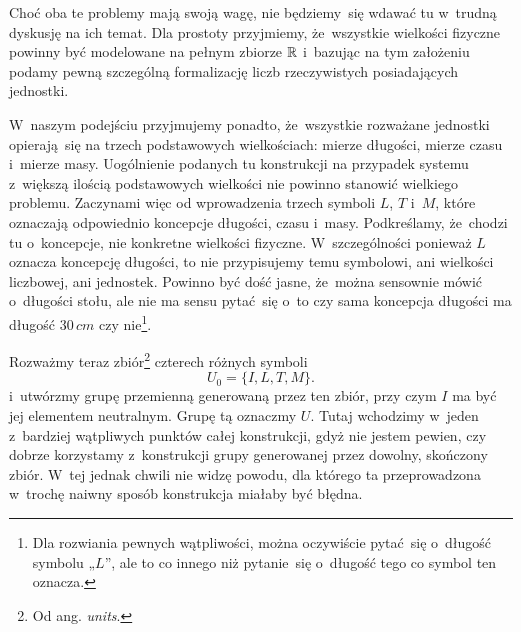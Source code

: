 \documentclass[a4paper,11pt]{article}
\numberwithin{equation}{section}
\begin{document}
Choć oba te problemy mają swoją wagę, nie będziemy~się wdawać tu w~trudną
dyskusję na ich temat. Dla prostoty przyjmiemy, że~wszystkie wielkości
fizyczne powinny być modelowane na pełnym zbiorze $\mathbb{R}$ i~bazując
na tym założeniu podamy pewną szczególną formalizację liczb rzeczywistych
posiadających jednostki.

W~naszym podejściu przyjmujemy ponadto, że~wszystkie rozważane jednostki
opierają~się na trzech podstawowych wielkościach: mierze długości,
mierze czasu i~mierze masy. Uogólnienie podanych tu konstrukcji na
przypadek systemu z~większą ilością podstawowych wielkości nie powinno
stanowić wielkiego problemu.
Zaczynami więc od wprowadzenia trzech symboli $L$, $T$ i~$M$, które
oznaczają odpowiednio koncepcje długości, czasu i~masy. Podkreślamy,
że~chodzi tu o~koncepcje, nie konkretne wielkości fizyczne. W~szczególności
ponieważ $L$ oznacza koncepcję długości, to nie przypisujemy temu symbolowi,
ani wielkości liczbowej, ani jednostek. Powinno być dość jasne, że~można
sensownie mówić o~długości stołu, ale nie ma sensu pytać~się o~to czy
sama koncepcja długości ma długość $30 \, \si{cm}$ czy nie\footnote{Dla
  rozwiania pewnych wątpliwości, można oczywiście pytać~się o~długość
  symbolu „$L$”, ale to co innego niż pytanie~się o~długość tego co symbol
  ten oznacza.}.

Rozważmy teraz zbiór\footnote{Od ang. \textit{units}.} czterech różnych
symboli
\begin{equation}
  \label{eq:Mechanika-Rozwazania-ogolne-02}
  U_{ 0 } = \{ I, L, T, M \}.
\end{equation}
i~utwórzmy grupę przemienną generowaną przez ten zbiór, przy czym $I$ ma
być jej elementem neutralnym. Grupę tą oznaczmy $U$. Tutaj wchodzimy
w~jeden z~bardziej wątpliwych punktów całej konstrukcji, gdyż nie jestem
pewien, czy dobrze korzystamy z~konstrukcji grupy generowanej przez
dowolny, skończony zbiór. W~tej jednak chwili nie widzę powodu, dla
którego ta przeprowadzona w~trochę naiwny sposób konstrukcja miałaby
być błędna.
\end{document}
